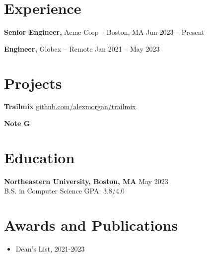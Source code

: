 \vspace{-6.5pt}

\section*{Experience}
\textbf{Senior Engineer,} Acme Corp -- Boston, MA \hfill Jun 2023 -- Present \\
\vspace{-9pt}
\begin{itemize}
  \label{airesumeItem1}

\end{itemize}

\textbf{Engineer,} Globex -- Remote \hfill Jan 2021 -- May 2023 \\
\vspace{-9pt}
\begin{itemize}
  \label{airesumeItem2}

\end{itemize}

\vspace{-18.5pt}

\section*{Projects}
\textbf{Trailmix} \hfill \href{https://github.com/alexmorgan/trailmix}{github.com/alexmorgan/trailmix} \\
\vspace{-9pt}
\begin{itemize}
  \label{airesumeItem3}

\end{itemize}

\textbf{Note G} \\
\vspace{-9pt}
\begin{itemize}
  \label{airesumeItem4}

\end{itemize}

\vspace{-18.5pt}

\section*{Education}
\textbf{Northeastern University, Boston, MA} \hfill May 2023 \\
B.S. in Computer Science \hfill GPA: 3.8/4.0 \\

\section*{Awards and Publications}
\begin{itemize}
  \item Dean's List, 2021-2023
\end{itemize}



